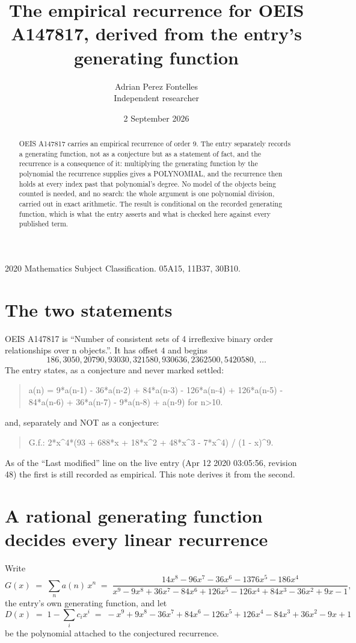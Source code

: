 \documentclass[11pt,a4paper]{article}
\title{The empirical recurrence for OEIS A147817, derived from the entry's generating function}
\author{Adrian Perez Fontelles\\ \small Independent researcher}
\date{2 September 2026}
\theoremstyle{plain}
\theoremstyle{definition}
\begin{document}
\maketitle

\begin{abstract}
OEIS A147817 carries an empirical recurrence of order $9$. The entry separately records a
generating function, not as a conjecture but as a statement of fact, and the recurrence is a
consequence of it: multiplying the generating function by the polynomial the recurrence
supplies gives a POLYNOMIAL, and the recurrence then holds at every index past that
polynomial's degree. No model of the objects being counted is needed, and no search: the
whole argument is one polynomial division, carried out in exact arithmetic. The result is
conditional on the recorded generating function, which is what the entry asserts and what is
checked here against every published term.
\end{abstract}

\noindent\small 2020 Mathematics Subject Classification. 05A15, 11B37, 30B10.\normalsize

\section{The two statements}

OEIS A147817 is ``Number of consistent sets of 4 irreflexive binary order relationships over n objects.''. It has offset $4$ and begins
\[
186, 3050, 20790, 93030, 321580, 930636, 2362500, 5420580,\ \dots
\]
The entry states, as a conjecture and never marked settled:
\begin{quote}
a(n) = 9*a(n-1) - 36*a(n-2) + 84*a(n-3) - 126*a(n-4) + 126*a(n-5) - 84*a(n-6) + 36*a(n-7) - 9*a(n-8) + a(n-9) for n>10.
\end{quote}
and, separately and NOT as a conjecture:
\begin{quote}
G.f.: 2*x\^{}4*(93 + 688*x + 18*x\^{}2 + 48*x\^{}3 - 7*x\^{}4) / (1 - x)\^{}9.
\end{quote}
As of the ``Last modified'' line on the live entry (Apr 12 2020 03:05:56, revision 48) the first is still
recorded as empirical. This note derives it from the second.

\section{A rational generating function decides every linear recurrence}

Write
\[
G(x)\;=\;\sum_{n}a(n)\,x^{n}\;=\;\frac{14 x^{8} - 96 x^{7} - 36 x^{6} - 1376 x^{5} - 186 x^{4}}{x^{9} - 9 x^{8} + 36 x^{7} - 84 x^{6} + 126 x^{5} - 126 x^{4} + 84 x^{3} - 36 x^{2} + 9 x - 1},
\]
the entry's own generating function, and let
\[
D(x)\;=\;1-\sum_i c_i x^{i}\;=\;- x^{9} + 9 x^{8} - 36 x^{7} + 84 x^{6} - 126 x^{5} + 126 x^{4} - 84 x^{3} + 36 x^{2} - 9 x + 1
\]
be the polynomial attached to the conjectured recurrence.
\end{document}
